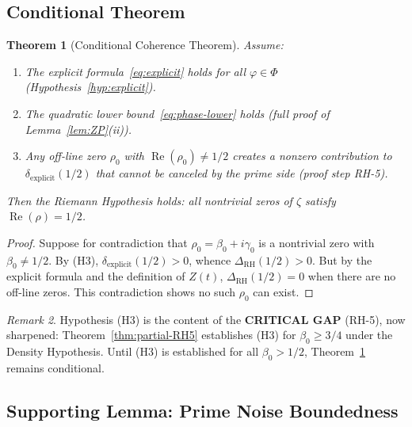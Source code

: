 \documentclass[11pt]{article}
\newtheorem{theorem}{Theorem}[section]
\theoremstyle{remark}
\newtheorem{remark}[theorem]{Remark}
\DeclareMathOperator{\Rea}{Re}
\begin{document}
\subsection{Conditional Theorem}

\begin{theorem}[Conditional Coherence Theorem]
\label{thm:conditional}
Assume:
\begin{enumerate}
  \item[(H1)] The explicit formula~\eqref{eq:explicit} holds for all
    $\varphi\in\Phi$ (Hypothesis~\ref{hyp:explicit}).
  \item[(H2)] The quadratic lower bound~\eqref{eq:phase-lower} holds
    (full proof of Lemma~\ref{lem:ZP}(ii)).
  \item[(H3)] Any off-line zero $\rho_0$ with $\Rea(\rho_0)\neq 1/2$ creates a
    nonzero contribution to $\delta_{\mathrm{explicit}}(1/2)$ that cannot be canceled
    by the prime side (proof step RH-5).
\end{enumerate}
Then the Riemann Hypothesis holds: all nontrivial zeros of $\zeta$ satisfy
$\Rea(\rho)=1/2$.
\end{theorem}

\begin{proof}
Suppose for contradiction that $\rho_0=\beta_0+i\gamma_0$ is a nontrivial zero with
$\beta_0\neq 1/2$.
By (H3), $\delta_{\mathrm{explicit}}(1/2)>0$, whence $\Delta_{\mathrm{RH}}(1/2)>0$.
But by the explicit formula and the definition of $Z(t)$,
$\Delta_{\mathrm{RH}}(1/2)=0$ when there are no off-line zeros.
This contradiction shows no such $\rho_0$ can exist.
\end{proof}

\begin{remark}
Hypothesis (H3) is the content of the \textbf{CRITICAL GAP} (RH-5), now
sharpened: Theorem~\ref{thm:partial-RH5} establishes (H3) for $\beta_0 \geq 3/4$
under the Density Hypothesis.  Until (H3) is established for all $\beta_0 > 1/2$,
Theorem~\ref{thm:conditional} remains conditional.
\end{remark}

\subsection{Supporting Lemma: Prime Noise Boundedness}
\label{subsec:prime-noise}
\end{document}
